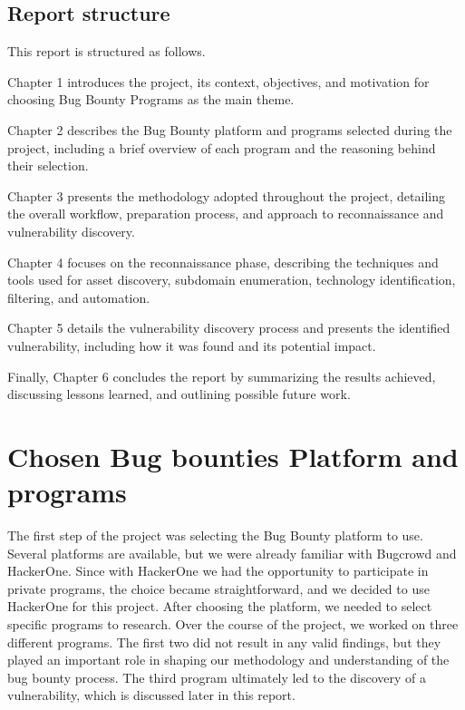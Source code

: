 \documentclass[12pt,a4paper]{report}
\begin{document}
\section{Report structure}

This report is structured as follows.

Chapter 1 introduces the project, its context, objectives, and motivation for choosing Bug Bounty Programs as the main theme.

Chapter 2 describes the Bug Bounty platform and programs selected during the project, including a brief overview of each program and the reasoning behind their selection.

Chapter 3 presents the methodology adopted throughout the project, detailing the overall workflow, preparation process, and approach to reconnaissance and vulnerability discovery.

Chapter 4 focuses on the reconnaissance phase, describing the techniques and tools used for asset discovery, subdomain enumeration, technology identification, filtering, and automation.

Chapter 5 details the vulnerability discovery process and presents the identified vulnerability, including how it was found and its potential impact.

Finally, Chapter 6 concludes the report by summarizing the results achieved, discussing lessons learned, and outlining possible future work.


\chapter{Chosen Bug bounties Platform and programs}

The first step of the project was selecting the Bug Bounty platform to use. Several platforms are available, but we were already familiar with Bugcrowd and HackerOne. Since with HackerOne we had the opportunity to participate in private programs, the choice became straightforward, and we decided to use HackerOne for this project.
After choosing the platform, we needed to select specific programs to research. Over the course of the project, we worked on three different programs. The first two did not result in any valid findings, but they played an important role in shaping our methodology and understanding of the bug bounty process. The third program ultimately led to the discovery of a vulnerability, which is discussed later in this report.
\end{document}
